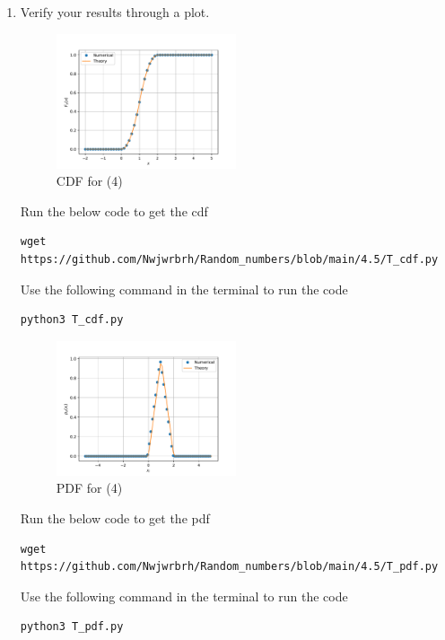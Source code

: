 \documentclass[journal,12pt,twocolumn]{IEEEtran}
\renewcommand\thesection{\arabic{section}}
\begin{document}
\begin{enumerate}[label=\thesection.\arabic*
,ref=\thesection.\theenumi]
\item Verify your results through a plot. 
\\
\solution 
\begin{figure}[h]
\includegraphics[width=0.5\textwidth]{../4.5/T_cdf.pdf}
\caption{CDF for (4)}
\label{fig:T_CDF}
\end{figure}
Run the below code to get the cdf
\begin{lstlisting}
wget https://github.com/Nwjwrbrh/Random_numbers/blob/main/4.5/T_cdf.py
\end{lstlisting}
Use the following command in the terminal to run the code
\begin{lstlisting}
python3 T_cdf.py
\end{lstlisting}
\begin{figure}[h]
\includegraphics[width=0.5\textwidth]{../4.5/T_pdf.pdf}
\caption{PDF for (4)}
\label{fig:T_PDF}
\end{figure}
Run the below code to get the pdf
\begin{lstlisting}
wget https://github.com/Nwjwrbrh/Random_numbers/blob/main/4.5/T_pdf.py
\end{lstlisting}
Use the following command in the terminal to run the code
\begin{lstlisting}
python3 T_pdf.py
\end{lstlisting}
\end{enumerate}
\end{document}
